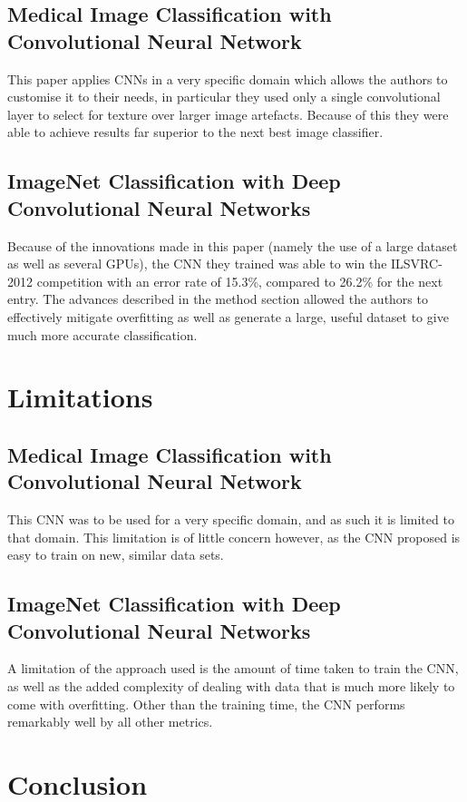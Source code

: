 \documentclass{article}
\begin{document}
\subsection{Medical Image Classification with Convolutional Neural Network}

This paper applies CNNs in a very specific domain which allows the authors to customise it to their needs, in particular they used only a single convolutional layer to select for texture over larger image artefacts. Because of this they were able to achieve results far superior to the next best image classifier\cite{medical}.

\subsection{ImageNet Classification with Deep Convolutional Neural Networks}
Because of the innovations made in this paper (namely the use of a large dataset as well as several GPUs), the CNN they trained was able to win the ILSVRC-2012 competition with an error rate of 15.3\%, compared to 26.2\% for the next entry\cite{imagenet}. The advances described in the method section allowed the authors to effectively mitigate overfitting as well as generate a large, useful dataset to give much more accurate classification.

\section{Limitations}
\subsection{Medical Image Classification with Convolutional Neural Network}
This CNN was to be used for a very specific domain, and as such it is limited to that domain. This limitation is of little concern however, as the CNN proposed is easy to train on new, similar data sets.

\subsection{ImageNet Classification with Deep Convolutional Neural Networks}
A limitation of the approach used is the amount of time taken to train the CNN, as well as the added complexity of dealing with data that is much more likely to come with overfitting. Other than the training time, the CNN performs remarkably well by all other metrics.


\section{Conclusion}



\end{document}
